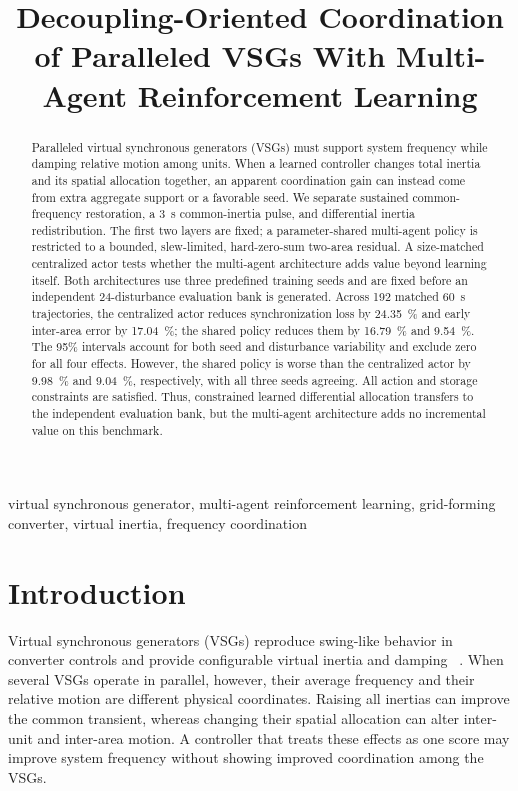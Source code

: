 \documentclass[conference,a4paper]{IEEEtran}
\title{Decoupling-Oriented Coordination of Paralleled VSGs With
Multi-Agent Reinforcement Learning}
\author{
\IEEEauthorblockN{Yuang Wei, Yixiao Wang, and Zhuang Xu}
\IEEEauthorblockA{
Department of Electrical and Electronic Engineering\\
University of Nottingham Ningbo China, Ningbo, China\\
John.XU@nottingham.edu.cn}
}
\begin{document}
\pagestyle{empty}
\maketitle

\begin{abstract}
Paralleled virtual synchronous generators (VSGs) must support system frequency
while damping relative motion among units. When a learned controller changes
total inertia and its spatial allocation together, an apparent coordination
gain can instead come from extra aggregate support or a favorable seed. We
separate sustained common-frequency restoration, a \SI{3}{s} common-inertia
pulse, and differential inertia redistribution. The first two layers are fixed;
a parameter-shared multi-agent policy is restricted to a bounded, slew-limited,
hard-zero-sum two-area residual. A size-matched centralized actor tests whether
the multi-agent architecture adds value beyond learning itself. Both
architectures use three predefined training seeds and are fixed before an
independent 24-disturbance evaluation bank is generated.
Across 192 matched \SI{60}{s} trajectories, the centralized actor reduces
synchronization loss by \SI{24.35}{\percent} and early inter-area error by
\SI{17.04}{\percent}; the shared policy reduces them by
\SI{16.79}{\percent} and \SI{9.54}{\percent}. The 95\% intervals account for
both seed and disturbance variability and exclude zero for all four effects.
However, the shared policy is worse than the centralized actor by
\SI{9.98}{\percent} and \SI{9.04}{\percent}, respectively, with all three seeds
agreeing. All action and storage constraints are satisfied. Thus, constrained
learned differential allocation transfers to the independent evaluation bank,
but the multi-agent architecture adds no incremental value on this benchmark.
\end{abstract}

\begin{IEEEkeywords}
virtual synchronous generator, multi-agent reinforcement learning,
grid-forming converter, virtual inertia, frequency coordination
\end{IEEEkeywords}

\section{Introduction}

Virtual synchronous generators (VSGs) reproduce swing-like behavior in
converter controls and provide configurable virtual inertia and damping
~\cite{zhong2011synchronverters,darco2013vsm}. When several VSGs operate in
parallel, however, their average frequency and their relative motion are
different physical coordinates. Raising all inertias can improve the common
transient, whereas changing their spatial allocation can alter inter-unit and
inter-area motion. A controller that treats these effects as one score may
improve system frequency without showing improved coordination among the VSGs.
\end{document}
